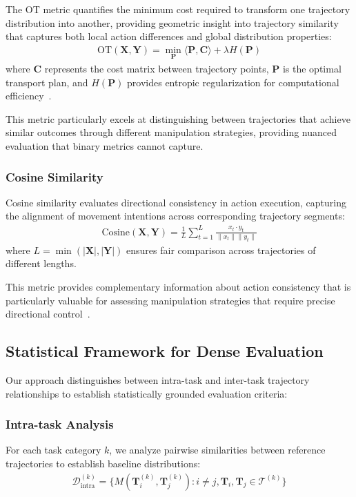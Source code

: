 \documentclass[10pt,twocolumn]{article}
\begin{document}
The OT metric quantifies the minimum cost required to transform one trajectory distribution into another, providing geometric insight into trajectory similarity that captures both local action differences and global distribution properties:
\begin{align}
\text{OT}(\mathbf{X}, \mathbf{Y}) = \min_{\mathbf{P}} \langle \mathbf{P}, \mathbf{C} \rangle + \lambda H(\mathbf{P})
\end{align}
where $\mathbf{C}$ represents the cost matrix between trajectory points, $\mathbf{P}$ is the optimal transport plan, and $H(\mathbf{P})$ provides entropic regularization for computational efficiency~\cite{cuturi2013sinkhorn}.

This metric particularly excels at distinguishing between trajectories that achieve similar outcomes through different manipulation strategies, providing nuanced evaluation that binary metrics cannot capture.

\subsubsection{Cosine Similarity}

Cosine similarity evaluates directional consistency in action execution, capturing the alignment of movement intentions across corresponding trajectory segments:
\begin{align}
\text{Cosine}(\mathbf{X}, \mathbf{Y}) = \frac{1}{L} \sum_{t=1}^{L} \frac{x_t \cdot y_t}{\|x_t\| \|y_t\|}
\end{align}
where $L = \min(|\mathbf{X}|, |\mathbf{Y}|)$ ensures fair comparison across trajectories of different lengths.

This metric provides complementary information about action consistency that is particularly valuable for assessing manipulation strategies that require precise directional control~\cite{haarnoja2018soft}.

\subsection{Statistical Framework for Dense Evaluation}

Our approach distinguishes between intra-task and inter-task trajectory relationships to establish statistically grounded evaluation criteria:

\subsubsection{Intra-task Analysis}
For each task category $k$, we analyze pairwise similarities between reference trajectories to establish baseline distributions:
\begin{align}
\mathcal{D}_{\text{intra}}^{(k)} = \{M(\mathbf{T}_i^{(k)}, \mathbf{T}_j^{(k)}) : i \neq j, \mathbf{T}_i, \mathbf{T}_j \in \mathcal{T}^{(k)}\}
\end{align}
\end{document}

